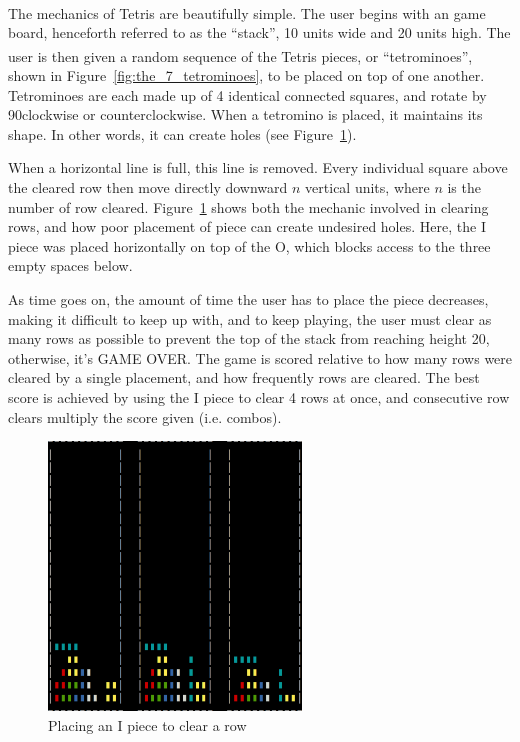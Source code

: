 \documentclass[fontsize=12pt]{article}
\def\tetris{Tetris\textsuperscript{\textregistered}}
\begin{document}
\par The mechanics of \tetris{} are beautifully simple. The user begins with an game board, henceforth referred to as the ``stack'', 10 units wide and 20 units high. The user is then given a random sequence of the \tetris{} pieces, or ``tetrominoes'', shown in Figure~\ref{fig:the_7_tetrominoes}, to be placed on top of one another. Tetrominoes are each made up of 4 identical connected squares, and rotate by 90\textdegree clockwise or counterclockwise. When a tetromino is placed, it maintains its shape. In other words, it can create holes (see Figure~\ref{fig:placing_an_i_piece_to_clear_a_row}).
\par When a horizontal line is full, this line is removed. Every individual square above the cleared row then move directly downward $n$ vertical units, where $n$ is the number of row cleared. Figure~\ref{fig:placing_an_i_piece_to_clear_a_row} shows both the mechanic involved in clearing rows, and how poor placement of piece can create undesired holes. Here, the I piece was placed horizontally on top of the O, which blocks access to the three empty spaces below.
\par As time goes on, the amount of time the user has to place the piece decreases, making it difficult to keep up with, and to keep playing, the user must clear as many rows as possible to prevent the top of the stack from reaching height 20, otherwise, it's GAME OVER. The game is scored relative to how many rows were cleared by a single placement, and how frequently rows are cleared. The best score is achieved by using the I piece to clear 4 rows at once, and consecutive row clears multiply the score given (i.e. combos).

\begin{figure}[h!]
  \centering
  \includegraphics[width=0.6\textwidth, height=0.4\textwidth]{figures/rowclear-crop}
  \caption{Placing an I piece to clear a row}
  \label{fig:placing_an_i_piece_to_clear_a_row}
\end{figure}
\end{document}
